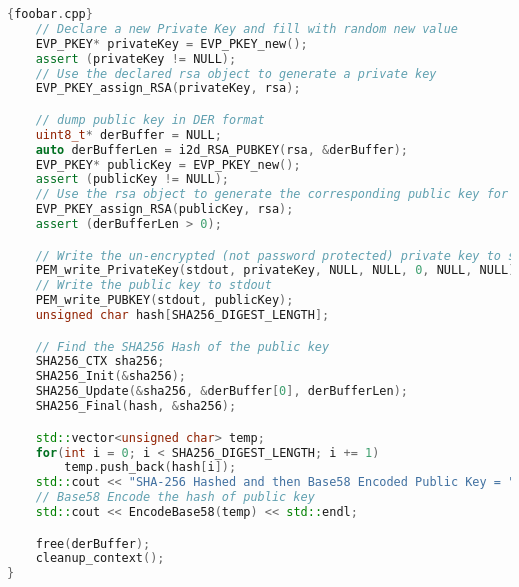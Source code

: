 \begin{lstlisting}[language=c++]{foobar.cpp}
	// Declare a new Private Key and fill with random new value
	EVP_PKEY* privateKey = EVP_PKEY_new();
	assert (privateKey != NULL);
	// Use the declared rsa object to generate a private key
	EVP_PKEY_assign_RSA(privateKey, rsa);

	// dump public key in DER format
	uint8_t* derBuffer = NULL;
	auto derBufferLen = i2d_RSA_PUBKEY(rsa, &derBuffer);
	EVP_PKEY* publicKey = EVP_PKEY_new();
	assert (publicKey != NULL);
	// Use the rsa object to generate the corresponding public key for privateKey 
	EVP_PKEY_assign_RSA(publicKey, rsa);
	assert (derBufferLen > 0);

	// Write the un-encrypted (not password protected) private key to stdout
	PEM_write_PrivateKey(stdout, privateKey, NULL, NULL, 0, NULL, NULL);
	// Write the public key to stdout 
	PEM_write_PUBKEY(stdout, publicKey);
	unsigned char hash[SHA256_DIGEST_LENGTH];

	// Find the SHA256 Hash of the public key
	SHA256_CTX sha256;
	SHA256_Init(&sha256);
	SHA256_Update(&sha256, &derBuffer[0], derBufferLen);
	SHA256_Final(hash, &sha256);

	std::vector<unsigned char> temp;
	for(int i = 0; i < SHA256_DIGEST_LENGTH; i += 1)
		temp.push_back(hash[i]);
	std::cout << "SHA-256 Hashed and then Base58 Encoded Public Key = " << std::endl;
	// Base58 Encode the hash of public key 
	std::cout << EncodeBase58(temp) << std::endl;

	free(derBuffer);
	cleanup_context();
}
\end{lstlisting}

